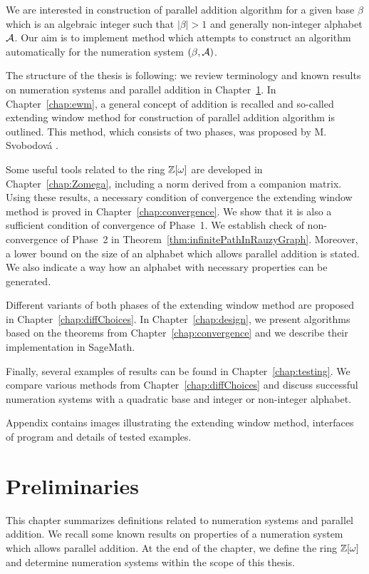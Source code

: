 We are interested in construction of parallel addition algorithm for a given base $\beta$ which is an algebraic integer such that $|\beta|>1$ and generally non-integer alphabet $\mathcal{A}$. Our aim is to implement method which attempts to construct an algorithm automatically for the numeration system $(\beta,\mathcal{A})$. 

The structure of the thesis is following: we review terminology and known results on numeration systems and parallel addition in Chapter~\ref{chap:preliminaries}. In Chapter~\ref{chap:ewm}, a general concept of addition is recalled and so-called extending window method for construction of parallel addition algorithm is outlined. This method, which consists of two phases, was proposed by M. Svobodov\'a \cite{milena}. 

Some useful tools related to the ring $\mathbb{Z}[\omega]$ are developed in Chapter~\ref{chap:Zomega}, including a norm derived from a companion matrix. Using these results, a necessary condition of convergence the extending window method is proved in Chapter~\ref{chap:convergence}. We show that it is also a sufficient condition of convergence of Phase~1. We establish check of non-convergence of Phase~2 in Theorem~\ref{thm:infinitePathInRauzyGraph}. Moreover, a lower bound on the size of an alphabet which allows parallel addition is stated. We also indicate a way how an alphabet with necessary properties can be generated.

Different variants of both phases of the extending window method are proposed in Chapter~\ref{chap:diffChoices}. In Chapter~\ref{chap:design}, we present algorithms based on the theorems from Chapter~\ref{chap:convergence} and we describe their implementation in SageMath.

Finally, several examples of results can be found in Chapter~\ref{chap:testing}. We compare various methods from Chapter~\ref{chap:diffChoices} and discuss successful numeration systems with a quadratic base and integer or non-integer alphabet. 

Appendix contains images illustrating the extending window method, interfaces of program and details of tested examples.

\chapter{Preliminaries}
\label{chap:preliminaries}
This chapter summarizes definitions related to numeration systems and parallel addition. We recall some known results on properties of a numeration system which allows parallel addition. At the end of the chapter, we define the ring $\mathbb{Z}[\omega]$ and determine numeration systems within the scope of this thesis.
	





